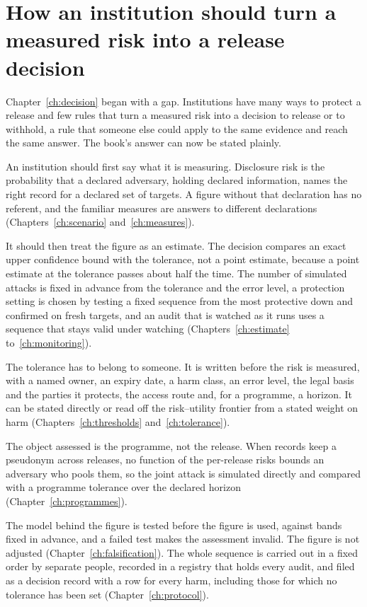 \section{How an institution should turn a measured risk into a release decision}

Chapter~\ref{ch:decision} began with a gap. Institutions have many ways to protect a
release and few rules that turn a measured risk into a decision to release or to
withhold, a rule that someone else could apply to the same evidence and reach the
same answer. The book's answer can now be stated plainly.

An institution should first say what it is measuring. Disclosure risk is the
probability that a declared adversary, holding declared information, names the right
record for a declared set of targets. A figure without that declaration has no
referent, and the familiar measures are answers to different declarations
(Chapters~\ref{ch:scenario} and~\ref{ch:measures}).

It should then treat the figure as an estimate. The decision compares an exact upper
confidence bound with the tolerance, not a point estimate, because a point estimate at
the tolerance passes about half the time. The number of simulated attacks is fixed in
advance from the tolerance and the error level, a protection setting is chosen by
testing a fixed sequence from the most protective down and confirmed on fresh
targets, and an audit that is watched as it runs uses a sequence that stays valid
under watching (Chapters~\ref{ch:estimate} to~\ref{ch:monitoring}).

The tolerance has to belong to someone. It is written before the risk is measured,
with a named owner, an expiry date, a harm class, an error level, the legal basis and
the parties it protects, the access route and, for a programme, a horizon. It can be
stated directly or read off the risk--utility frontier from a stated weight on harm
(Chapters~\ref{ch:thresholds} and~\ref{ch:tolerance}).

The object assessed is the programme, not the release. When records keep a pseudonym
across releases, no function of the per-release risks bounds an adversary who pools
them, so the joint attack is simulated directly and compared with a programme
tolerance over the declared horizon (Chapter~\ref{ch:programmes}).

The model behind the figure is tested before the figure is used, against bands fixed
in advance, and a failed test makes the assessment invalid. The figure is not adjusted
(Chapter~\ref{ch:falsification}). The whole sequence is carried out in a fixed order
by separate people, recorded in a registry that holds every audit, and filed as a
decision record with a row for every harm, including those for which no tolerance has
been set (Chapter~\ref{ch:protocol}).

